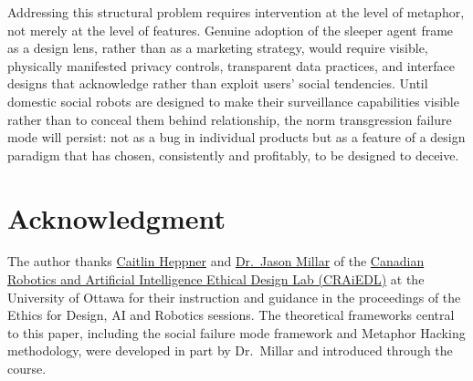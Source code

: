 \documentclass{ieee-portfolio}
\begin{document}
Addressing this structural problem requires intervention at the level of metaphor, not merely at the level of features. Genuine adoption of the sleeper agent frame as a design lens, rather than as a marketing strategy, would require visible, physically manifested privacy controls, transparent data practices, and interface designs that acknowledge rather than exploit users' social tendencies. Until domestic social robots are designed to make their surveillance capabilities visible rather than to conceal them behind relationship, the norm transgression failure mode will persist: not as a bug in individual products but as a feature of a design paradigm that has chosen, consistently and profitably, to be designed to deceive.

\section*{Acknowledgment}
The author thanks \href{https://craiedl.ca/team/caitlin-heppner}{Caitlin Heppner} and \href{https://craiedl.ca/team/jason-millar}{Dr.\ Jason Millar} of the \href{https://craiedl.ca}{Canadian Robotics and Artificial Intelligence Ethical Design Lab (CRAiEDL)} at the University of Ottawa for their instruction and guidance in the proceedings of the Ethics for Design, AI and Robotics sessions. The theoretical frameworks central to this paper, including the social failure mode framework and Metaphor Hacking methodology, were developed in part by Dr.\ Millar and introduced through the course.

\glsaddall
\printglossary[type=\acronymtype,title=List of Acronyms]



\end{document}
